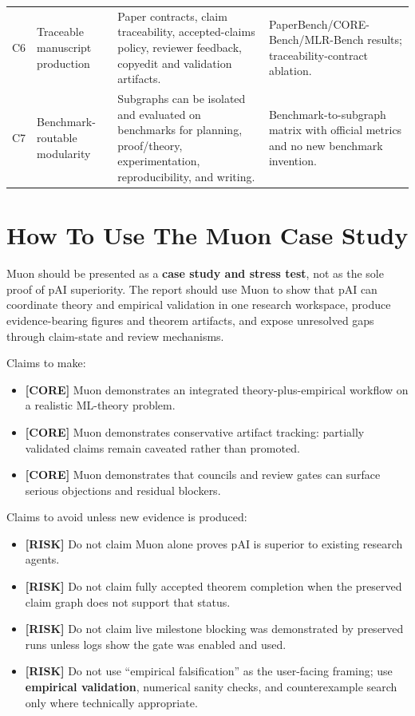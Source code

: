 \documentclass[11pt]{article}
\newcommand{\core}{\textbf{\textcolor{green!45!black}{[CORE]}}}
\newcommand{\risk}{\textbf{\textcolor{red!65!black}{[RISK]}}}
\newcommand{\pai}{pAI}
\begin{document}
\begin{longtable}{>{\raggedright\arraybackslash}p{} >{\raggedright\arraybackslash}p{} >{\raggedright\arraybackslash}p{} >{\raggedright\arraybackslash}p{}}
C6 & Traceable manuscript production & Paper contracts, claim traceability, accepted-claims policy, reviewer feedback, copyedit and validation artifacts. & PaperBench/CORE-Bench/MLR-Bench results; traceability-contract ablation. \\
C7 & Benchmark-routable modularity & Subgraphs can be isolated and evaluated on benchmarks for planning, proof/theory, experimentation, reproducibility, and writing. & Benchmark-to-subgraph matrix with official metrics and no new benchmark invention. \\
\bottomrule
\end{longtable}

\section*{How To Use The Muon Case Study}

Muon should be presented as a \textbf{case study and stress test}, not as the sole proof of \pai{} superiority. The report should use Muon to show that \pai{} can coordinate theory and empirical validation in one research workspace, produce evidence-bearing figures and theorem artifacts, and expose unresolved gaps through claim-state and review mechanisms.

Claims to make:
\begin{itemize}
  \item \core{} Muon demonstrates an integrated theory-plus-empirical workflow on a realistic ML-theory problem.
  \item \core{} Muon demonstrates conservative artifact tracking: partially validated claims remain caveated rather than promoted.
  \item \core{} Muon demonstrates that councils and review gates can surface serious objections and residual blockers.
\end{itemize}

Claims to avoid unless new evidence is produced:
\begin{itemize}
  \item \risk{} Do not claim Muon alone proves \pai{} is superior to existing research agents.
  \item \risk{} Do not claim fully accepted theorem completion when the preserved claim graph does not support that status.
  \item \risk{} Do not claim live milestone blocking was demonstrated by preserved runs unless logs show the gate was enabled and used.
  \item \risk{} Do not use ``empirical falsification'' as the user-facing framing; use \textbf{empirical validation}, numerical sanity checks, and counterexample search only where technically appropriate.
\end{itemize}
\end{document}
